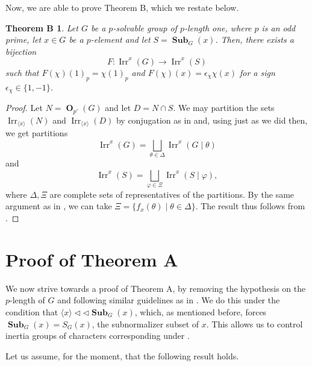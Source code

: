 \documentclass[12pt]{amsart}
\DeclareMathOperator{\OB}{\mathbf{O}}
\DeclareMathOperator{\Sub}{\mathbf{Sub}}
\DeclareMathOperator{\Irr}{Irr}
\theoremstyle{remark}
\theoremstyle{definition}
\theoremstyle{plain}
\newtheorem*{thmB}{Theorem B}
\theoremstyle{definition}
\numberwithin{equation}{section}
\begin{document}
Now, we are able to prove Theorem B, which we restate below.

\begin{thmB}
	Let $G$ be a $p$-solvable group of $p$-length one, where $p$ is an odd prime, let $x \in G$ be a $p$-element and let $S = \Sub_G(x)$. Then, there exists a bijection $$F: \Irr^x(G) \to \Irr^x(S)$$ such that $F(\chi)(1)_p = \chi(1)_p$ and $F(\chi)(x) = \epsilon_\chi\chi(x)$ for a sign $\epsilon_\chi \in \{1, -1\}$.
\end{thmB}

\begin{proof}
	Let $N = \OB_{p'}(G)$ and let $D = N \cap S$. We may partition the sets $\Irr_{\langle x \rangle}(N)$ and $\Irr_{\langle x \rangle}(D)$ by conjugation as in  and, using  just as we did then, we get partitions
	\begin{equation*}
		\Irr^x(G) = \bigsqcup_{\theta \in \Delta} \Irr^x(G \mid \theta)
	\end{equation*}
	and
	\begin{equation*}
		\Irr^x(S) = \bigsqcup_{\varphi \in \Xi} \Irr^x(S \mid \varphi),
	\end{equation*}
	where $\Delta, \Xi$ are complete sets of representatives of the partitions. By the same argument as in , we can take $\Xi = \{f_x(\theta) \mid \theta \in \Delta\}$. The result thus follows from .
\end{proof}

\section{Proof of Theorem A}
\label{Section 5}

We now strive towards a proof of Theorem A, by removing the hypothesis on the $p$-length of $G$ and following similar guidelines as in \cite{PickyPSolvable}. We do this under the condition that $\langle x \rangle {\triangleleft}{\triangleleft} \Sub_G(x)$, which, as mentioned before, forces $\Sub_G(x) = S_G(x)$, the subnormalizer subset of $x$. This allows us to control inertia groups of characters corresponding under .

Let us assume, for the moment, that the following result holds.
\end{document}
